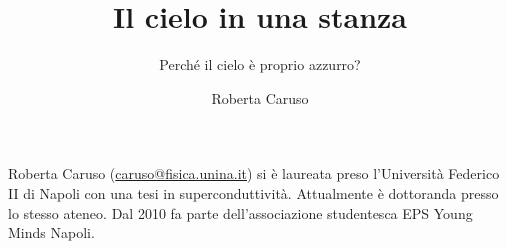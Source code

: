 ﻿\title{Il cielo in una stanza}
\subtitle{Perché il cielo è proprio azzurro?}
\suptitle{\phantom{x}}
\author{Roberta Caruso}
\maketitle
\begin{small}
\pichskip{4mm}
\nobalance



\vfill
\begin{thebiography}{}%
Roberta Caruso (\url{caruso@fisica.unina.it}) si è laureata preso l'Università Federico II di Napoli con una tesi in superconduttività.
Attualmente è dottoranda presso lo stesso ateneo. Dal 2010 fa parte dell'associazione studentesca EPS Young Minds Napoli.
\end{thebiography}
\end{small}


